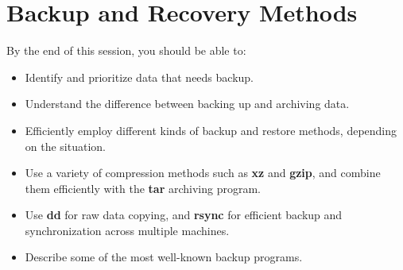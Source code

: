 \chapter{Backup and Recovery Methods}

\lflogo
\minitoc

\begin{lfbox}

   By the end of this session, you should be able to:

   \begin{itemize}

      \item
      Identify and prioritize data that needs backup.
      \item
      Understand the difference between backing up and
      archiving data.
      \item
      ​Efficiently employ different kinds of backup and restore
      methods, depending on the situation.
      \item
      Use a variety of compression methods such as \textbf{xz}
      and \textbf{gzip}, and combine them efficiently with the
      \textbf{tar} archiving program.
      \item
      Use \textbf{dd} for raw data copying, and \textbf{rsync}
      for efficient backup and synchronization across multiple
      machines.
      \item
      Describe some of the most well-known backup programs.

   \end{itemize}

\end{lfbox}

\optionalfootnotetext

\clearpage









